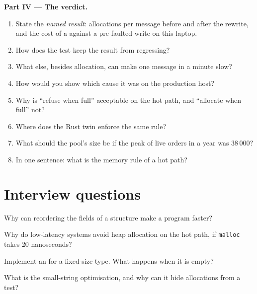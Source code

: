 \begin{problem}
\medskip\noindent\textbf{Part IV --- The verdict.}
\begin{enumerate}[resume]
\item State the \emph{named result}: allocations per message before and after the rewrite, and the cost of a 
against a pre-faulted write on this laptop.
\item How does the test keep the result from regressing?
\item What else, besides allocation, can make one message in a minute slow?
\item How would you show which cause it was on the production host?
\item Why is ``refuse when full'' acceptable on the hot path, and ``allocate when full'' not?
\item Where does the Rust twin enforce the same rule?
\item What should the pool's size be if the peak of live orders in a year was 38\,000?
\item In one sentence: what is the memory rule of a hot path?
\end{enumerate}
\end{problem}

\section{Interview questions}

\begin{interviewq}\label{iq:ll:cpp-for-latency-i-memory:1}
Why can reordering the fields of a structure make a program faster?
\end{interviewq}

\begin{interviewq}\label{iq:ll:cpp-for-latency-i-memory:2}
Why do low-latency systems avoid heap allocation on the hot path, if \texttt{malloc} takes 20 nanoseconds?
\end{interviewq}

\begin{interviewq}\label{iq:ll:cpp-for-latency-i-memory:3}
Implement an  for a fixed-size type. What happens when it is empty?
\end{interviewq}

\begin{interviewq}\label{iq:ll:cpp-for-latency-i-memory:4}
What is the small-string optimisation, and why can it hide allocations from a test?
\end{interviewq}


